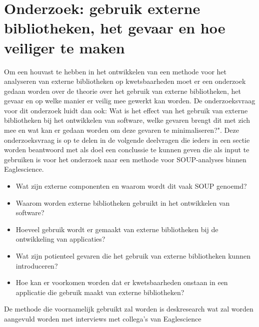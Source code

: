 \usepackage{natbib}%
\chapter{Onderzoek: gebruik externe bibliotheken, het gevaar en hoe veiliger te maken}\label{ch:externeBibliothekengebruikGevaren}
Om een houvast te hebben in het ontwikkelen van een methode voor het analyseren van externe bibliotheken op kwetsbaarheden moet er een onderzoek gedaan worden over de theorie over het gebruik van externe bibliotheken, het gevaar en op welke manier er veilig mee gewerkt kan worden. De onderzoeksvraag voor dit onderzoek luidt dan ook: Wat is het effect van het gebruik van externe bibliotheken bij het ontwikkelen van software, welke gevaren brengt dit met zich mee en wat kan er gedaan worden om deze gevaren te minimaliseren?". Deze onderzoeksvraag is op te delen in de volgende deelvragen die ieders in een sectie worden beantwoord met als doel een conclussie te kunnen geven die als input te gebruiken is voor het onderzoek naar een methode voor SOUP-analyses binnen Eaglescience.

\begin{itemize}
    \item Wat zijn externe componenten en waarom wordt dit vaak SOUP genoemd?
    \item Waarom worden externe bibliotheken gebruikt in het ontwikkelen van software?
    \item Hoeveel gebruik wordt er gemaakt van externe bibliotheken bij de ontwikkeling van applicaties?
    \item Wat zijn potienteel gevaren die het gebruik van externe bibliotheken kunnen introduceren?
    \item Hoe kan er voorkomen worden dat er kwetsbaarheden onstaan in een applicatie die gebruik maakt van externe bibliotheken?
\end{itemize}
De methode die voornamelijk gebruikt zal worden is deskresearch wat zal worden aangevuld worden met interviews met collega's van Eaglescience

